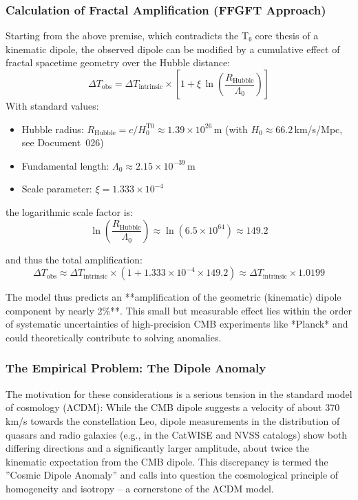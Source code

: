 	\subsubsection*{Calculation of Fractal Amplification (FFGFT Approach)}
	
	Starting from the above premise, which contradicts the T₀ core thesis of a kinematic dipole, the observed dipole can be modified by a cumulative effect of fractal spacetime geometry over the Hubble distance:
	\[
	\Delta T_{\text{obs}} = \Delta T_{\text{intrinsic}} \times \left[1 + \xi \, \ln\left(\frac{R_{\text{Hubble}}}{\Lambda_0}\right)\right]
	\]
	With standard values:
	\begin{itemize}
		\item Hubble radius: $R_{\text{Hubble}} = c/H_0^{\text{T0}} \approx 1.39 \times 10^{26} \, \text{m}$ (with $H_0 \approx 66.2\,$km/s/Mpc, see Document~026)
		\item Fundamental length: $\Lambda_0 \approx 2.15 \times 10^{-39} \, \text{m}$
		\item Scale parameter: $\xi = 1.333 \times 10^{-4}$
	\end{itemize}
	
	the logarithmic scale factor is:
	\[
	\ln\left(\frac{R_{\text{Hubble}}}{\Lambda_0}\right) \approx \ln(6.5 \times 10^{64}) \approx 149.2
	\]
	
	and thus the total amplification:
	\[
	\Delta T_{\text{obs}} \approx \Delta T_{\text{intrinsic}} \times (1 + 1.333\times10^{-4} \times 149.2) \approx \Delta T_{\text{intrinsic}} \times 1.0199
	\]
	
	The model thus predicts an **amplification of the geometric (kinematic) dipole component by nearly 2\%**. This small but measurable effect lies within the order of systematic uncertainties of high-precision CMB experiments like *Planck* and could theoretically contribute to solving anomalies.
	
	\subsubsection*{The Empirical Problem: The Dipole Anomaly}
	
	The motivation for these considerations is a serious tension in the standard model of cosmology (ΛCDM): While the CMB dipole suggests a velocity of about 370 km/s towards the constellation Leo, dipole measurements in the distribution of quasars and radio galaxies (e.g., in the CatWISE and NVSS catalogs) show both differing directions and a significantly larger amplitude, about twice the kinematic expectation from the CMB dipole. This discrepancy is termed the ''Cosmic Dipole Anomaly'' and calls into question the cosmological principle of homogeneity and isotropy – a cornerstone of the ΛCDM model.
	
